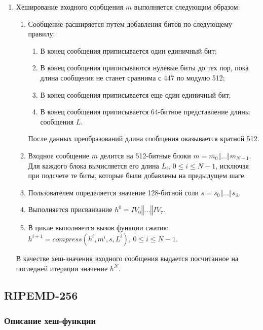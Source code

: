 \documentclass{./civarticle}
\begin{document}
\begin{enumerate}
\item Хеширование входного сообщения $m$ выполняется следующим образом:

\begin{enumerate}
    \item Сообщение расширяется путем добавления битов по следующему правилу:

    \begin{enumerate}
        \item В конец сообщения приписывается один единичный бит;
        \item В конец сообщения приписываются нулевые биты до тех пор, пока длина сообщения не станет сравнима с 447 по модулю 512;
        \item В конец сообщения приписывается еще один единичный бит;
        \item В конец сообщения приписывается 64-битное представление длины сообщения $L$.
    \end{enumerate}
    После данных преобразований длина сообщения оказывается кратной 512.

    \item Входное сообщение $m$ делится на 512-битные блоки $m = m_0 \mathbin\Vert ... \mathbin\Vert m_{N-1}$. Для каждого блока вычисляется его длина $L_i$, $0 \leq i \leq N-1$, исключая при подсчете те биты, которые были добавлены на предыдущем шаге.

    \item Пользователем определяется значение 128-битной соли $s = s_0 \mathbin\Vert ... \mathbin\Vert s_3$.

    \item Выполняется присваивание $h^0 = IV_0 \mathbin\Vert ... \mathbin\Vert IV_7$.

    \item В цикле выполняется вызов функции сжатия: $h^{i+1} = compress(h^i, m^i, s, L^i)$, $0 \leq i \leq N-1$.
    
\end{enumerate}
    В качестве хеш-значения входного сообщения выдается посчитанное на последней итерации значение $h^N$.
\end{enumerate}

\subsection{RIPEMD-256}

\subsubsection{Описание хеш-функции}
\end{document}
